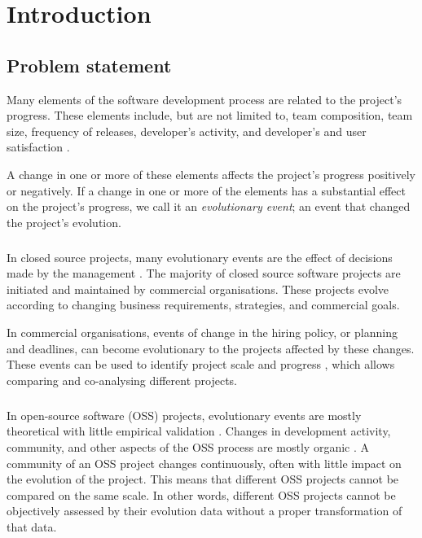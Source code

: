\chapter{Introduction}
\label{introduction}

\section{Problem statement}
Many elements of the software development process are related to the project's
progress. These elements include, but are not limited to, team composition,
team size, frequency of releases, developer's activity, and developer's and
user satisfaction \cite{crowston2006, delone1992, samoladas2010}.

A change in one or more of these elements affects the project's progress
positively or negatively. If a change in one or more of the elements has a
substantial effect on the project's progress, we call it an \emph{evolutionary
event}\rm; an event that changed the project's evolution.

\paragraph{}
In closed source projects, many evolutionary events are the effect of decisions
made by the management \cite{karus2013}. The majority of closed source software
projects are initiated and maintained by commercial organisations. These
projects evolve according to changing business requirements, strategies, and
commercial goals.

In commercial organisations, events of change in the hiring policy, or
planning and deadlines, can become evolutionary to the projects affected by
these changes. These events can be used to identify project scale and progress
\cite{karus2013}, which allows comparing and co-analysing different projects.

\paragraph{}
In open-source software (OSS) projects, evolutionary events are mostly
theoretical with little empirical validation \cite{karus2013}. Changes in
development activity, community, and other aspects of the OSS process are
mostly organic \cite{androutsellis}. A community of an OSS project changes
continuously, often with little impact on the evolution of the project. This
means that different OSS projects cannot be compared on the same scale. In
other words, different OSS projects cannot be objectively assessed by their
evolution data without a proper transformation of that data.

